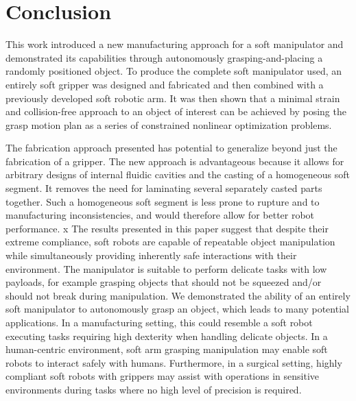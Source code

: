 \section{Conclusion}
\label{sec:conclusion}
This work introduced a new manufacturing approach for a soft manipulator and demonstrated its capabilities through autonomously grasping-and-placing a randomly positioned object.
To produce the complete soft manipulator used, an entirely soft gripper was designed and fabricated and then combined with a previously developed soft robotic arm.
It was then shown that a minimal strain and collision-free approach to an object of interest can be achieved by posing the grasp motion plan as a series of constrained nonlinear optimization problems.

The fabrication approach presented has potential to generalize beyond just the fabrication of a gripper.
The new approach is advantageous because it allows for arbitrary designs of internal fluidic cavities and the casting of a homogeneous soft segment. It removes the need for laminating several separately casted parts together.
Such a homogeneous soft segment is less prone to rupture and to manufacturing inconsistencies, and would therefore allow for better robot performance.
x
The results presented in this paper suggest that despite their extreme compliance, soft robots are capable of repeatable object manipulation while simultaneously providing inherently safe interactions with their environment.
The manipulator is suitable to perform delicate tasks with low payloads, for example grasping objects that should not be squeezed and/or should not break during manipulation.
We demonstrated the ability of an entirely soft manipulator to autonomously grasp an object, which leads to many potential applications.
In a manufacturing setting, this could resemble a soft robot executing tasks requiring high dexterity when handling delicate objects.
In a human-centric environment, soft arm grasping manipulation may enable soft robots to interact safely with humans.
Furthermore, in a surgical setting, highly compliant soft robots with grippers may assist with operations in sensitive environments during tasks where no high level of precision is required.


